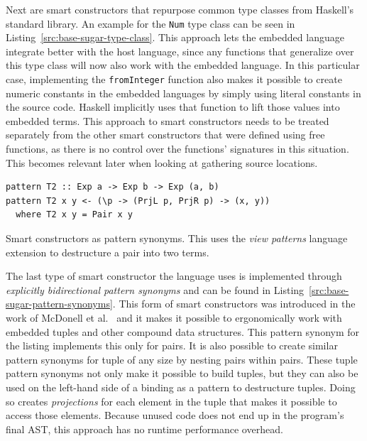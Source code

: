 \documentclass[fontsize=11pt,a4paper,parskip=half,numbers=noenddot]{scrartcl}
\newcommand{\hask}[1]{\texttt{#1}}
\begin{document}
Next are smart constructors that repurpose common type classes from Haskell's
standard library. An example for the \hask{Num} type class can be seen in
Listing~\ref{src:base-sugar-type-class}. This approach lets the embedded
language integrate better with the host language, since any functions that
generalize over this type class will now also work with the embedded language.
In this particular case, implementing the \hask{fromInteger} function also makes
it possible to create numeric constants in the embedded languages by simply
using literal constants in the source code. Haskell implicitly uses that
function to lift those values into embedded terms. This approach to smart
constructors needs to be treated separately from the other smart constructors
that were defined using free functions, as there is no control over the
functions' signatures in this situation. This becomes relevant later when
looking at gathering source locations.

\label{sec:language-smart-constructors-patterns}

\begin{listing}[!ht]
\begin{verbatim}
pattern T2 :: Exp a -> Exp b -> Exp (a, b)
pattern T2 x y <- (\p -> (PrjL p, PrjR p) -> (x, y))
  where T2 x y = Pair x y
\end{verbatim}
\caption{Smart constructors as pattern synonyms. This uses the \emph{view patterns} language extension to destructure a pair into two terms.}\label{src:base-sugar-pattern-synonyms}
\end{listing}

The last type of smart constructor the language uses is implemented through
\emph{explicitly bidirectional pattern synonyms} and can be found in
Listing~\ref{src:base-sugar-pattern-synonyms}. This form of smart constructors
was introduced in the work of McDonell et al.~\cite{mcdonell2021embedded} and it
makes it possible to ergonomically work with embedded tuples and other compound
data structures. This pattern synonym for the listing implements this only for
pairs. It is also possible to create similar pattern synonyms for tuple of any
size by nesting pairs within pairs. These tuple pattern synonyms not only make
it possible to build tuples, but they can also be used on the left-hand side of
a binding as a pattern to destructure tuples. Doing so creates
\emph{projections} for each element in the tuple that makes it possible to
access those elements. Because unused code does not end up in the program's
final AST, this approach has no runtime performance overhead.
\end{document}
